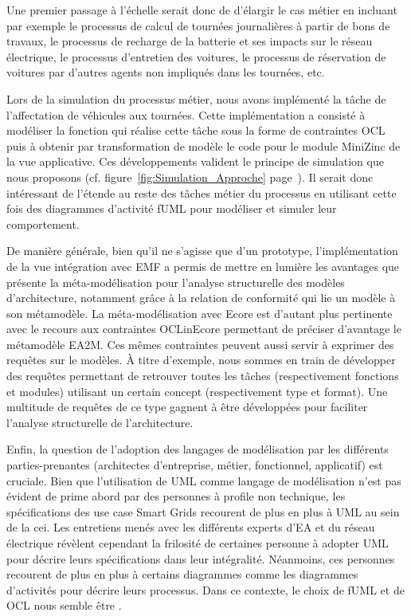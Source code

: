     Une premier passage à l'échelle serait donc de d'élargir le cas métier en incluant par exemple
    le processus de calcul de tournées journalières à partir de bons de travaux, le processus
    de recharge de la batterie et ses impacts sur le réseau électrique, le processus d'entretien des
    voitures, le processus de réservation de voitures par d'autres agents non impliqués dans les tournées,
    etc. 

    Lors de la simulation du processus métier, nous avons implémenté la
    tâche de l'affectation de véhicules aux tournées. Cette implémentation a consisté à modéliser
    la fonction qui réalise cette tâche sous la forme de contraintes OCL puis à obtenir par transformation
    de modèle le code pour le module MiniZinc de la vue applicative. 
    Ces développements valident le principe
    de simulation que nous proposons (cf. figure~\ref{fig:Simulation_Approche} page~\pageref{fig:Simulation_Approche}).
    Il serait donc intéressant de l'étende au reste des tâches métier du processus en utilisant cette fois des diagrammes
    d'activité fUML pour modéliser et simuler leur comportement.

    De manière générale, bien qu'il ne s'agisse que d'un prototype, l'implémentation de la vue intégration avec EMF
    a permis de mettre en lumière les avantages que présente la méta-modélisation pour l'analyse structurelle
    des modèles d'architecture, notamment grâce à la relation de conformité qui lie un modèle à son métamodèle.
    La méta-modélisation avec Ecore est d'autant plus pertinente avec le recours aux contraintes OCLinEcore
    permettant de préciser d'avantage le métamodèle EA2M. Ces mêmes contraintes peuvent aussi servir à
    exprimer des requêtes sur le modèles. À titre d'exemple, nous sommes en train de développer des requêtes
    permettant de retrouver toutes les tâches (respectivement
    fonctions et modules) utilisant un certain concept (respectivement type et format). Une multitude de requêtes de ce
    type gagnent à être développées pour faciliter l'analyse structurelle de l'architecture.

    Enfin, la question de l'adoption des langages de modélisation par les différents parties-prenantes (architectes
    d'entreprise, métier, fonctionnel, applicatif) est cruciale. Bien que l'utilisation de UML comme
    langage de modélisation n'est pas évident de prime abord par des personnes à profile non technique,
    les spécifications des use case Smart Grids recourent de plus en plus à UML au sein de la \gls{cei}.
    Les entretiens menés avec les différents experts d'EA et du réseau électrique révèlent cependant la frilosité
    de certaines personne à adopter UML pour décrire leurs spécifications dans leur intégralité. Néanmoins, ces
    personnes recourent de plus en plus à certains diagrammes comme les diagrammes d'activités pour décrire
    leurs processus. Dans ce contexte, le choix de fUML et de OCL nous semble être .

